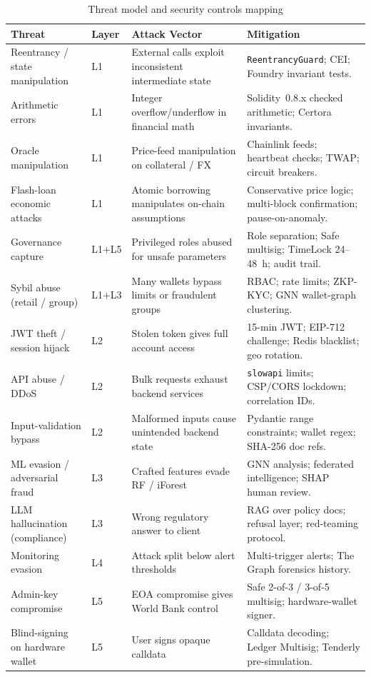 \documentclass[12pt, a4paper]{report}
\newcommand{\tableheadcolor}{\rowcolor{TableHeadBg}}
\newcommand{\tableheadfont}{\bfseries}
\begin{document}
\begin{table}[H]
\centering
\caption[Threat model and security controls mapping]{Threat model and security controls mapping}
\label{tab:threat-model}
\footnotesize
\setlength{\tabcolsep}{4pt}
\begin{tabular}{@{}p{2.3cm}p{1.1cm}p{3.6cm}p{5.8cm}@{}}
\toprule
\tableheadcolor
\tableheadfont Threat & \tableheadfont Layer & \tableheadfont Attack Vector & \tableheadfont Mitigation \\
\midrule
Reentrancy / state manipulation & L1 & External calls exploit inconsistent intermediate state & \texttt{ReentrancyGuard}; CEI; Foundry invariant tests. \\
\rowcolor{RowShade}
Arithmetic errors & L1 & Integer overflow/underflow in financial math & Solidity~0.8.x checked arithmetic; Certora invariants. \\
Oracle manipulation & L1 & Price-feed manipulation on collateral / FX & Chainlink feeds; heartbeat checks; TWAP; circuit breakers. \\
\rowcolor{RowShade}
Flash-loan economic attacks & L1 & Atomic borrowing manipulates on-chain assumptions & Conservative price logic; multi-block confirmation; pause-on-anomaly. \\
Governance capture & L1+L5 & Privileged roles abused for unsafe parameters & Role separation; Safe multisig; TimeLock 24--48~h; audit trail. \\
\rowcolor{RowShade}
Sybil abuse (retail / group) & L1+L3 & Many wallets bypass limits or fraudulent groups & RBAC; rate limits; ZKP-KYC; GNN wallet-graph clustering. \\
JWT theft / session hijack & L2 & Stolen token gives full account access & 15-min JWT; EIP-712 challenge; Redis blacklist; geo rotation. \\
\rowcolor{RowShade}
API abuse / DDoS & L2 & Bulk requests exhaust backend services & \texttt{slowapi} limits; CSP/CORS lockdown; correlation IDs. \\
Input-validation bypass & L2 & Malformed inputs cause unintended backend state & Pydantic range constraints; wallet regex; SHA-256 doc refs. \\
\rowcolor{RowShade}
ML evasion / adversarial fraud & L3 & Crafted features evade RF / iForest & GNN analysis; federated intelligence; SHAP human review. \\
LLM hallucination (compliance) & L3 & Wrong regulatory answer to client & RAG over policy docs; refusal layer; red-teaming protocol. \\
\rowcolor{RowShade}
Monitoring evasion & L4 & Attack split below alert thresholds & Multi-trigger alerts; The Graph forensics history. \\
Admin-key compromise & L5 & EOA compromise gives World Bank control & Safe 2-of-3 / 3-of-5 multisig; hardware-wallet signer. \\
\rowcolor{RowShade}
Blind-signing on hardware wallet & L5 & User signs opaque calldata & Calldata decoding; Ledger Multisig; Tenderly pre-simulation. \\
\bottomrule
\end{tabular}
\end{table}
\end{document}
